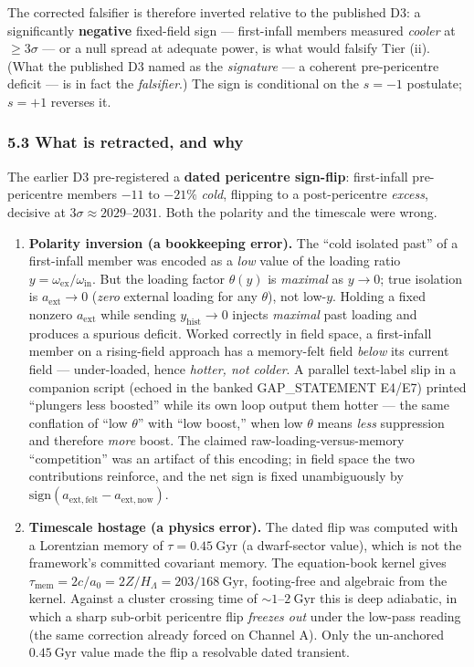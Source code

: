 \documentclass[
]{article}
\begin{document}
The corrected falsifier is therefore inverted relative to the published
D3: a significantly \textbf{negative} fixed-field sign --- first-infall
members measured \emph{cooler} at \(\ge3\sigma\) --- or a null spread at
adequate power, is what would falsify Tier (ii). (What the published D3
named as the \emph{signature} --- a coherent pre-pericentre deficit ---
is in fact the \emph{falsifier}.) The sign is conditional on the
\(s=-1\) postulate; \(s=+1\) reverses it.

\subsubsection{5.3 What is retracted, and
why}\label{what-is-retracted-and-why}

The earlier D3 pre-registered a \textbf{dated pericentre sign-flip}:
first-infall pre-pericentre members \(-11\) to \(-21\%\) \emph{cold},
flipping to a post-pericentre \emph{excess}, decisive at
\(3\sigma\approx2029\)--\(2031\). Both the polarity and the timescale
were wrong.

\begin{enumerate}
\def\labelenumi{\arabic{enumi}.}
\item
  \textbf{Polarity inversion (a bookkeeping error).} The ``cold isolated
  past'' of a first-infall member was encoded as a \emph{low} value of
  the loading ratio \(y=\omega_\mathrm{ex}/\omega_\mathrm{in}\). But the
  loading factor \(\theta(y)\) is \emph{maximal} as \(y\to0\); true
  isolation is \(a_\mathrm{ext}\to0\) (\emph{zero} external loading for any
  \(\theta\)), not low-\(y\). Holding a fixed nonzero \(a_\mathrm{ext}\)
  while sending \(y_\mathrm{hist}\to0\) injects \emph{maximal} past loading
  and produces a spurious deficit. Worked correctly in field space, a
  first-infall member on a rising-field approach has a memory-felt field
  \emph{below} its current field --- under-loaded, hence \emph{hotter,
  not colder}. A parallel text-label slip in a companion script (echoed
  in the banked GAP\_STATEMENT E4/E7) printed ``plungers less boosted''
  while its own loop output them hotter --- the same conflation of ``low
  \(\theta\)'' with ``low boost,'' when low \(\theta\) means \emph{less}
  suppression and therefore \emph{more} boost. The claimed
  raw-loading-versus-memory ``competition'' was an artifact of this
  encoding; in field space the two contributions reinforce, and the net
  sign is fixed unambiguously by
  \(\mathrm{sign}(a_\mathrm{ext,felt}-a_\mathrm{ext,now})\).
\item
  \textbf{Timescale hostage (a physics error).} The dated flip was
  computed with a Lorentzian memory of \(\tau=0.45\ \mathrm{Gyr}\) (a
  dwarf-sector value), which is not the framework's committed covariant
  memory. The equation-book kernel gives
  \(\tau_\mathrm{mem}=2c/a_0=2Z/H_\Lambda=203/168\ \mathrm{Gyr}\),
  footing-free and algebraic from the kernel. Against a cluster crossing
  time of \(\sim1\)--\(2\ \mathrm{Gyr}\) this is deep adiabatic, in
  which a sharp sub-orbit pericentre flip \emph{freezes out} under the
  low-pass reading (the same correction already forced on Channel A).
  Only the un-anchored \(0.45\ \mathrm{Gyr}\) value made the flip a
  resolvable dated transient.
\end{enumerate}
\end{document}

